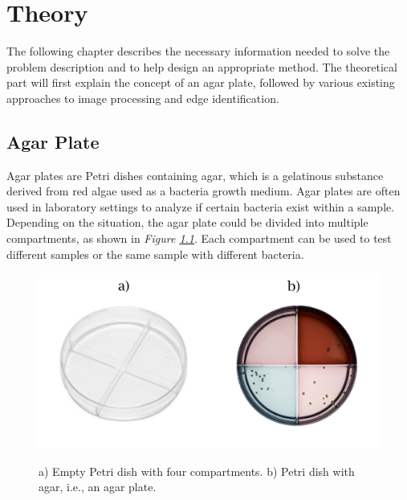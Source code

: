 


\chapter{Theory}
The following chapter describes the necessary information needed to solve the problem description and to help design an appropriate method. The theoretical part will first explain the concept of an agar plate, followed by various existing approaches to image processing and edge identification. 
\\

\section{Agar Plate}
Agar plates are Petri dishes containing agar, which is a gelatinous substance derived from red algae used as a bacteria growth medium. Agar plates are often used in laboratory settings to analyze if certain bacteria exist within a sample. Depending on the situation, the agar plate could be divided into multiple compartments, as shown in \textit{Figure \ref{fig:agar plate}}. Each compartment can be used to test different samples or the same sample with different bacteria.



    \begin{figure}[htbp]
        \begin{center}
            \includegraphics[width=.7\linewidth]{figures/petri.jpg}\\
            \caption{ a) Empty Petri dish with four compartments. b) Petri dish with agar, i.e., an agar plate.}
            \label{fig:agar plate}
        \end{center}
    \end{figure}

